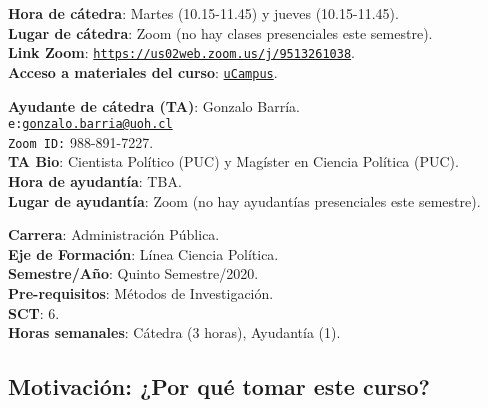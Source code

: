 \documentclass[letterpaper]{article}
\begin{document}
\vspace{5mm}
{\bf Hora de c\'atedra}: Martes (10.15-11.45) y jueves (10.15-11.45).\\
{\bf Lugar de c\'atedra}: Zoom (no hay clases presenciales este semestre).\\
{\bf Link Zoom}: \href{https://us02web.zoom.us/j/9513261038}{\texttt{https://us02web.zoom.us/j/9513261038}}.\\
{\bf Acceso a materiales del curso}: \href{https://ucampus.uoh.cl/uoh/2021/1/APU3601/1/}{\texttt{uCampus}}.

\vspace{5mm}
{\bf Ayudante de c\'atedra (TA)}: Gonzalo Barr\'ia.\\
\texttt{e:}\href{mailto:gonzalo.barria@uoh.cl}{\texttt{gonzalo.barria@uoh.cl}}\\
\texttt{Zoom ID:} 988-891-7227.\\
{\bf TA Bio}: Cientista Pol\'itico (PUC) y Mag\'ister en Ciencia Pol\'itica (PUC).\\
{\bf Hora de ayudant\'ia}: TBA.\\
{\bf Lugar de ayudant\'ia}: Zoom (no hay ayudant\'ias presenciales este semestre).


\vspace{5mm}
{\bf Carrera}:	Administraci\'on P\'ublica.\\
{\bf Eje de Formaci\'on}: L\'inea Ciencia Pol\'itica.\\
{\bf Semestre/A\~no}:	Quinto Semestre/2020.\\
{\bf Pre-requisitos}: M\'etodos de Investigaci\'on.\\
{\bf SCT}: 6.\\
{\bf Horas semanales}: C\'atedra (3 horas), Ayudant\'ia	(1).



\subsection*{Motivaci\'on: ¿Por qu\'e tomar este curso?}
\end{document}
